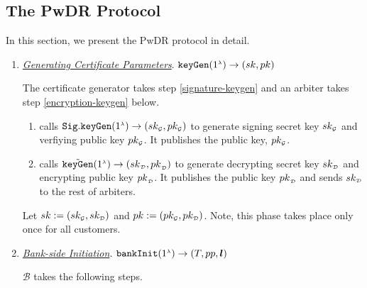 


\subsection{The PwDR Protocol}
In this section, we present the PwDR protocol in detail. 





\begin{enumerate}

\item \underline{\textit{Generating  Certificate Parameters}}.  $\mathtt{keyGen}(1^{\scriptscriptstyle \lambda})\rightarrow (sk,pk)$

The certificate generator  takes   step \ref{signature-keygen} and an arbiter takes step \ref{encryption-keygen} below. 

\begin{enumerate}
\item\label{signature-keygen} calls $\mathtt{Sig.keyGen}(1^{\scriptscriptstyle \lambda})\rightarrow (sk_{\scriptscriptstyle\mathcal{G}}, pk_{\scriptscriptstyle\mathcal{G}})$ to generate  signing secret key $sk_{\scriptscriptstyle\mathcal{G}}$ and  verfiying public key $pk_{\scriptscriptstyle\mathcal{G}}$. It publishes the public key, $pk_{\scriptscriptstyle\mathcal{G}}$.
%
\item\label{encryption-keygen} calls $\tilde{\mathtt{keyGen}}(1^{\scriptscriptstyle\lambda})\rightarrow({sk}_{\scriptscriptstyle\mathcal {D}}, {pk}_{\scriptscriptstyle\mathcal {D}})$ to generate  decrypting secret key ${sk}_{\scriptscriptstyle\mathcal {D}}$ and encrypting public key ${pk}_{\scriptscriptstyle\mathcal {D}}$. It publishes the public key ${pk}_{\scriptscriptstyle\mathcal {D}}$ and sends ${sk}_{\scriptscriptstyle\mathcal {D}}$ to the rest of arbiters.
\end{enumerate}


Let $sk:=(sk_{\scriptscriptstyle\mathcal{G}}, sk_{\scriptscriptstyle\mathcal{D}})$ and $pk:=(pk_{\scriptscriptstyle\mathcal{G}}, pk_{\scriptscriptstyle\mathcal{D}})$. Note, this   phase takes place only once for all customers.
\vspace{2mm}
\item\label{RCPoRP::Bank-side-Initiation} \underline{\textit{Bank-side Initiation}}. $\mathtt{bankInit}(1^{\scriptscriptstyle \lambda})\rightarrow (T, pp, \bm l)$

$\mathcal{B}$ takes the following steps. 
\begin{enumerate}


\end{enumerate}
\end{enumerate}
